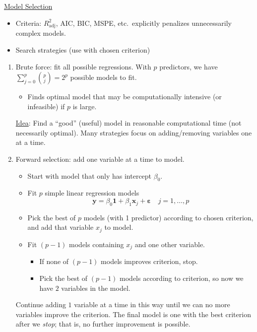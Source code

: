 \underline{Model Selection}
\begin{itemize}
      \item Criteria: $ R^2_{\text{adj}} $, AIC, BIC,
            MSPE, etc.\ explicitly penalizes unnecessarily
            complex models.
      \item Search strategies (use with chosen
            criterion)
\end{itemize}
\begin{enumerate}[label=(\roman*)]
      \item Brute force: fit all possible regressions.
            With $ p $ predictors, we have
            $ \sum_{j=0}^{p} \binom{p}{j}=2^p $ possible models to fit.
            \begin{itemize}
                  \item Finds optimal model that may be computationally
                        intensive (or infeasible) if $ p $ is large.
            \end{itemize}

            \underline{Idea}: Find a ``good'' (useful)
            model in reasonable computational time (not necessarily optimal).
            Many strategies focus on adding/removing variables one at a time.
      \item Forward selection: add one variable at a time to model.
            \begin{itemize}
                  \item Start with model that only has intercept $ \beta_0 $.
                  \item Fit $ p $ simple linear regression models
                        \[ \symbf{y}=\beta_0 \symbf{1}+\beta_1\symbf{x}_j
                              +\symbf{\varepsilon}\quad j=1,\ldots,p \]
                  \item Pick the best of $ p $ models (with 1 predictor)
                        according to chosen criterion, and add that variable
                        $ x_j $ to model.
                  \item Fit $ (p-1) $ models containing $ x_j $
                        and one other variable.
                        \begin{itemize}
                              \item If none of $ (p-1) $ models improves
                                    criterion, stop.
                              \item Pick the best of $ (p-1) $ models according
                                    to criterion, so now we have $ 2 $ variables in the model.
                        \end{itemize}
            \end{itemize}
            Continue adding $ 1 $ variable at a time in this way until
            we can no more variables improve the criterion. The final
            model is one with the best criterion after we \emph{stop};
            that is, no further improvement is possible.


\end{enumerate}

